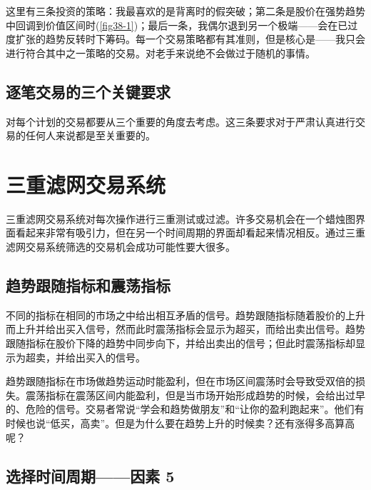 这里有三条投资的策略：我最喜欢的是背离时的假突破；第二条是股价在强势趋势中回调到价值区间时(\autoref{fig38-1})；最后一条，我偶尔退到另一个极端——会在已过度扩张的趋势反转时下筹码。每一个交易策略都有其准则，但是核心是——我只会进行符合其中之一策略的交易。对老手来说绝不会做过于随机的事情。
\subsection*{逐笔交易的三个关键要求}
对每个计划的交易都要从三个重要的角度去考虑。这三条要求对于严肃认真进行交易的任何人来说都是至关重要的。
\section{三重滤网交易系统}
三重滤网交易系统对每次操作进行三重测试或过滤。许多交易机会在一个蜡烛图界面看起来非常有吸引力，但在另一个时间周期的界面却看起来情况相反。通过三重滤网交易系统筛选的交易机会成功可能性要大很多。
\subsection*{趋势跟随指标和震荡指标}
不同的指标在相同的市场之中给出相互矛盾的信号。趋势跟随指标随着股价的上升而上升并给出买入信号，然而此时震荡指标会显示为超买，而给出卖出信号。趋势跟随指标在股价下降的趋势中同步向下，并给出卖出的信号；但此时震荡指标却显示为超卖，并给出买入的信号。

趋势跟随指标在市场做趋势运动时能盈利，但在市场区间震荡时会导致受双倍的损失。震荡指标在震荡区间内能盈利，但是当市场开始形成趋势的时候，会给出过早的、危险的信号。交易者常说“学会和趋势做朋友”和“让你的盈利跑起来”。他们有时候也说“低买，高卖”。但是为什么要在趋势上升的时候卖？还有涨得多高算高呢？
\subsection*{选择时间周期——因素 5}
